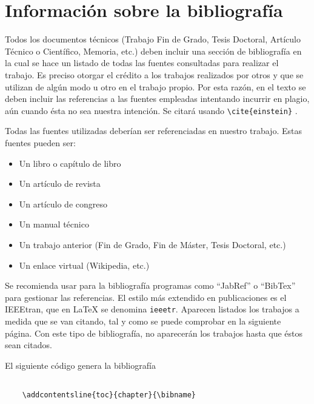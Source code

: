 \chapter*{Información sobre la bibliografía}
Todos los documentos técnicos (Trabajo Fin de Grado, Tesis Doctoral, Artículo Técnico o Científico, Memoria, etc.) deben incluir una sección de bibliografía en la cual se hace un listado de todas las fuentes consultadas para realizar el trabajo. Es preciso otorgar el crédito a los trabajos realizados por otros y que se utilizan de algún modo u otro en el trabajo propio. Por esta razón, en el texto se deben incluir las referencias a las fuentes empleadas intentando incurrir en plagio, aún cuando ésta no sea nuestra intención. Se citará usando \lstinline!\cite{einstein}! \cite{einstein}.


Todas las fuentes utilizadas deberían ser referenciadas en nuestro trabajo. Estas fuentes pueden ser:

\begin{itemize}
	\item Un libro o capítulo de libro
	\item Un artículo de revista
	\item Un artículo de congreso
	\item Un manual técnico
	\item Un trabajo anterior (Fin de Grado, Fin de Máster, Tesis Doctoral, etc.)
	\item Un enlace virtual (Wikipedia, etc.)
\end{itemize}

Se recomienda usar para la bibliografía programas como ``JabRef'' o ``BibTex'' para gestionar las referencias. El estilo más extendido en publicaciones es el IEEEtran, que en \LaTeX $ $ se denomina \texttt{ieeetr}. Aparecen listados los trabajos a medida que se van citando, tal y como se puede comprobar \cite{knuthwebsite} en la siguiente página. Con este tipo de bibliografía, no aparecerán los trabajos hasta que éstos sean citados.

El siguiente código genera la bibliografía
\begin{lstlisting}
	
	\addcontentsline{toc}{chapter}{\bibname}
	  
\end{lstlisting}